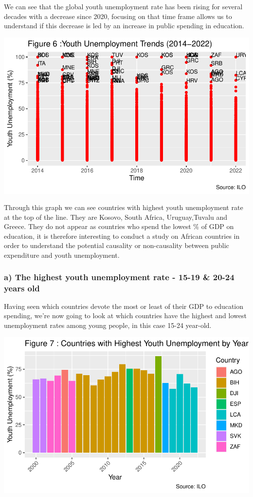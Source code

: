 \documentclass[
  letterpaper,
  DIV=11,
  numbers=noendperiod]{scrartcl}
\begin{document}
We can see that the global youth unemployment rate has been rising for
several decades with a decrease since 2020, focusing on that time frame
allows us to understand if this decrease is led by an increase in public
spending in education.

\includegraphics{Projet-BM_files/figure-pdf/unnamed-chunk-14-1.pdf}

Through this graph we can see countries with highest youth unemployment
rate at the top of the line. They are Kosovo, South Africa,
Uruguay,Tuvalu and Greece. They do not appear as countries who spend the
lowest \% of GDP on education, it is therefore interesting to conduct a
study on African countries in order to understand the potential
causality or non-causality between public expenditure and youth
unemployment.

\hypertarget{a-the-highest-youth-unemployment-rate---15-19-20-24-years-old}{%
\subsubsection{a) The highest youth unemployment rate - 15-19 \& 20-24
years
old}\label{a-the-highest-youth-unemployment-rate---15-19-20-24-years-old}}

Having seen which countries devote the most or least of their GDP to
education spending, we're now going to look at which countries have the
highest and lowest unemployment rates among young people, in this case
15-24 year-old.

\includegraphics{Projet-BM_files/figure-pdf/unnamed-chunk-15-1.pdf}
\end{document}
